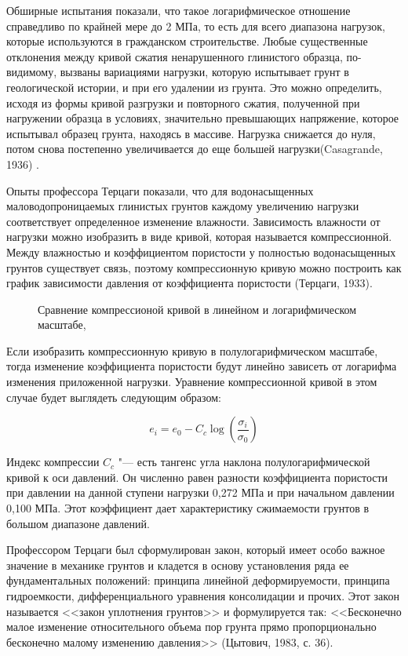 Обширные испытания показали, что такое логарифмическое отношение справедливо по крайней мере до 2 МПа, то есть для всего диапазона нагрузок, которые используются в гражданском строительстве. Любые существенные отклонения между кривой сжатия ненарушенного глинистого образца, по-видимому, вызваны вариациями нагрузки, которую испытывает грунт в геологической истории, и при его удалении из грунта. Это можно определить, исходя из формы кривой разгрузки и повторного сжатия, полученной при нагружении образца в условиях, значительно превышающих напряжение, которое испытывал образец грунта, находясь в массиве. Нагрузка снижается до нуля, потом снова постепенно увеличивается до еще большей нагрузки(Casagrande, 1936) \cite{cazagrande1936}.
 
 Опыты профессора Терцаги показали, что для водонасыщенных маловодопроницаемых глинистых грунтов каждому увеличению нагрузки соответствует определенное изменение влажности. 
 Зависимость влажности от нагрузки можно изобразить в виде кривой, которая называется компрессионной. 
 Между влажностью и коэффициентом пористости у полностью водонасыщенных грунтов существует связь, поэтому компрессионную кривую можно построить как график зависимости давления от коэффициента пористости (Терцаги, 1933)\cite{terz1933}.

 \begin{figure}[h]
  \label{fig:ellipse}
  \centering
  
  \caption{Сравнение компрессионой кривой в линейном и логарифмическом масштабе, \cite{cazagrande1936}}
 \end{figure}

 Если изобразить компрессионную кривую в полулогарифмическом масштабе, тогда изменение коэффициента пористости будут линейно зависеть от логарифма изменения приложенной нагрузки. Уравнение компрессионной кривой в этом случае будет выглядеть следующим образом:
 
 \begin{equation}
 e_i=e_0-C_c \log \left( \frac{\sigma_i}{\sigma_0} \right)
 \label{eq:ke}
 \end{equation}
 
 Индекс компрессии $C_c$ "--- есть тангенс угла наклона полулогарифмической кривой к оси давлений. Он численно равен разности коэффициента пористости при давлении на данной ступени нагрузки 0,272 МПа и при начальном давлении 0,100 МПа. Этот коэффициент дает характеристику сжимаемости грунтов в большом диапазоне давлений. 
 
 Профессором Терцаги был сформулирован закон, который имеет особо важное значение в механике грунтов и кладется в основу установления ряда ее фундаментальных положений: принципа линейной деформируемости, принципа гидроемкости, дифференциального уравнения консолидации и прочих. Этот закон называется <<закон уплотнения грунтов>> и формулируется так: <<Бесконечно малое изменение относительного объема пор грунта прямо пропорционально бесконечно малому изменению давления>> (Цытович, 1983, с. 36)\cite[36]{cytovich1983}.

